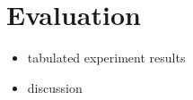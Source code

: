 \chapter{Evaluation}

\begin{itemize}
    \item tabulated experiment results
    \item discussion
\end{itemize}
